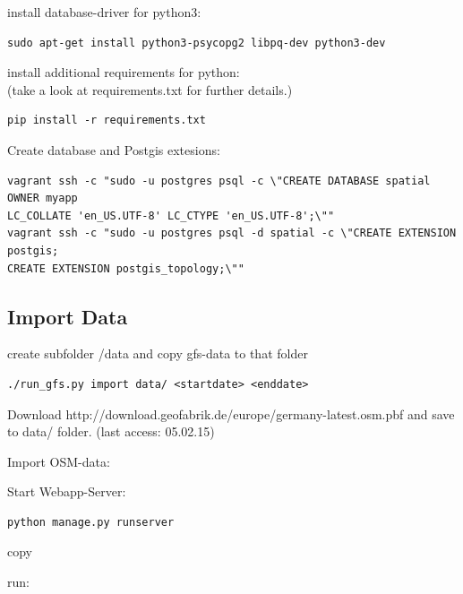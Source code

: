 \documentclass[paper=a4, fontsize=11pt]{scrartcl} %
\numberwithin{equation}{section} %
\numberwithin{figure}{section} %
\numberwithin{table}{section} %
\begin{document}
install database-driver for python3:
\begin{lstlisting}
sudo apt-get install python3-psycopg2 libpq-dev python3-dev
\end{lstlisting}

install additional requirements for python:\\
(take a look at requirements.txt for further details.)
\begin{lstlisting}
pip install -r requirements.txt
\end{lstlisting}

Create database and Postgis extesions:
\begin{lstlisting}
vagrant ssh -c "sudo -u postgres psql -c \"CREATE DATABASE spatial  OWNER myapp
LC_COLLATE 'en_US.UTF-8' LC_CTYPE 'en_US.UTF-8';\"" 
vagrant ssh -c "sudo -u postgres psql -d spatial -c \"CREATE EXTENSION postgis;
CREATE EXTENSION postgis_topology;\"" 
\end{lstlisting}
\subsection{Import Data}


create subfolder /data and copy gfs-data to that folder
\begin{lstlisting}
./run_gfs.py import data/ <startdate> <enddate>
\end{lstlisting}
Download http://download.geofabrik.de/europe/germany-latest.osm.pbf and save to data/ folder. (last access: 05.02.15)

Import OSM-data:


Start Webapp-Server:
\begin{lstlisting}
python manage.py runserver
\end{lstlisting}

copy %

run: %
\end{document}

